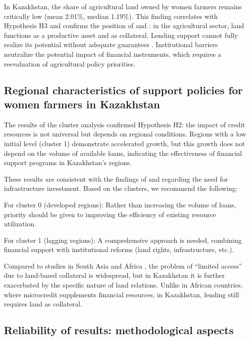 ﻿\documentclass[pdflatex,sn-mathphys-ay]{sn-jnl}
\begin{document}
In Kazakhstan, the share of agricultural land owned by women farmers
remains critically low (mean 2.01\%, median 1.19\%). This finding
correlates with Hypothesis H3 and confirms the position of
\citet{ref20} and \citet{ref06}: in the agricultural sector, land
functions as a productive asset and as collateral. Lending support
cannot fully realize its potential without adequate guarantees
\citep{ref26,ref02}. Institutional barriers
neutralize the potential impact of financial instruments, which requires
a reevaluation of agricultural policy priorities.

\subsection{Regional characteristics of support policies for women farmers in Kazakhstan}

The results of the cluster analysis confirmed Hypothesis H2: the impact
of credit resources is not universal but depends on regional conditions.
Regions with a low initial level (cluster 1) demonstrate accelerated
growth, but this growth does not depend on the volume of available
loans, indicating the effectiveness of financial support programs in
Kazakhstan's regions.

These results are consistent with the findings of \citet{ref21} and \citet{ref54} regarding the need for infrastructure
investment. Based on the clusters, we recommend the following:

For cluster 0 (developed regions): Rather than increasing the volume of
loans, priority should be given to improving the efficiency of existing
resource utilization.

For cluster 1 (lagging regions): A comprehensive approach is needed,
combining financial support with institutional reforms (land rights,
infrastructure, etc.).

Compared to studies in South Asia \citep{ref44} and Africa
\citep{ref27}, the problem of ``limited access'' due
to land-based collateral is widespread, but in Kazakhstan it is further
exacerbated by the specific nature of land relations. Unlike in African
countries, where microcredit supplements financial resources, in
Kazakhstan, lending still requires land as collateral.

\subsection{Reliability of results: methodological aspects}
\end{document}
